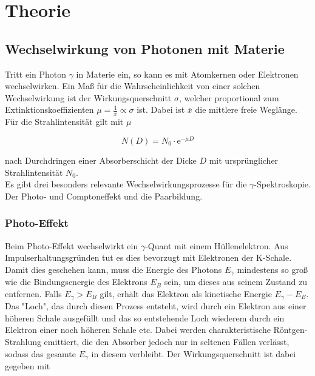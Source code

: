 \section{Theorie}
\label{sec:Theorie}

\subsection{Wechselwirkung von Photonen mit Materie}

Tritt ein Photon $\gamma$ in Materie ein, so kann es mit Atomkernen oder Elektronen wechselwirken. Ein Maß für die Wahrscheinlichkeit von 
einer solchen Wechselwirkung ist der Wirkungsquerschnitt $\sigma$, welcher proportional zum Extinktionskoeffizienten $\mu = \frac{1}{\bar{x}} \propto \sigma$
ist. Dabei ist $\bar{x}$ die mittlere freie Weglänge. Für die Strahlintensität gilt mit $\mu$

\begin{equation}
    N\left(D\right) = N_0 \cdot \text{e}^{-\mu D}
    \label{eqn:Strahl}
\end{equation}

nach Durchdringen einer Absorberschicht der Dicke $D$ mit ursprünglicher Strahlintensität $N_0$.\\

Es gibt drei besonders relevante Wechselwirkungsprozesse für die $\gamma$-Spektroskopie. Der Photo- und Comptoneffekt und die Paarbildung.

\subsubsection{Photo-Effekt}

Beim Photo-Effekt wechselwirkt ein $\gamma$-Quant mit einem Hüllenelektron. Aus Impulserhaltungsgründen tut es dies bevorzugt mit Elektronen der 
K-Schale. Damit dies geschehen kann, muss die Energie des Photons $E_\gamma$ mindestens so groß wie die Bindungsenergie des Elektrons $E_B$ sein, 
um dieses aus seinem Zustand zu entfernen. Falls $E_\gamma > E_B$ gilt, erhält das Elektron als kinetische Energie $E_\gamma - E_B$. Das "Loch", 
das durch diesen Prozess entsteht, wird durch ein Elektron aus einer höheren Schale ausgefüllt und das so entstehende Loch wiederem durch ein 
Elektron einer noch höheren Schale etc. Dabei werden charakteristische Röntgen-Strahlung emittiert, die den Absorber jedoch nur in seltenen 
Fällen verlässt, sodass das gesamte $E_\gamma$ in diesem verbleibt. Der Wirkungsquerschnitt ist dabei gegeben mit 

